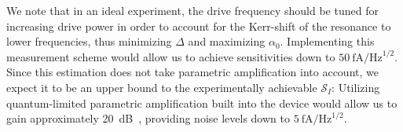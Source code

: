 % 
We note that in an ideal experiment, the drive frequency should be tuned for increasing drive power in order to account for the Kerr-shift of the resonance to lower frequencies, thus minimizing $\Delta$ and maximizing $\alpha_0$.
% 
Implementing this measurement scheme would allow us to achieve sensitivities down to $\SI{50}{\femto\ampere\per\hertz\tothe{1/2}}$.
% 
Since this estimation does not take parametric amplification into account, we expect it to be an upper bound to the experimentally achievable $\mathcal{S}_I$:
% 
Utilizing quantum-limited parametric amplification built into the device would allow us to gain approximately \SI{20}{dB}~\cite{stehlikFastChargeSensing2015,pogorzalekHystereticFluxResponse2017,planatUnderstandingSaturationPower2019}, providing noise levels down to $\SI{5}{\femto\ampere\per\hertz\tothe{1/2}}$.

